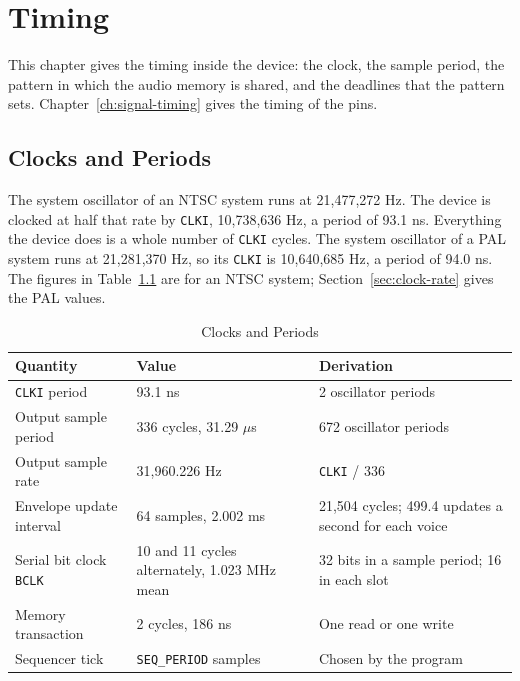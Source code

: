 \chapter{Timing}
\label{ch:timing}

This chapter gives the timing inside the device: the clock, the sample period, the pattern in which the audio memory is
shared, and the deadlines that the pattern sets. Chapter~\ref{ch:signal-timing} gives the timing of the pins.

\section{Clocks and Periods}

The system oscillator of an NTSC system runs at 21,477,272 Hz. The device is clocked at half that rate by
\texttt{CLKI}, 10,738,636 Hz, a period of 93.1 ns. Everything the device does is a whole number of \texttt{CLKI}
cycles. The system oscillator of a PAL system runs at 21,281,370 Hz, so its \texttt{CLKI} is 10,640,685 Hz, a period of
94.0 ns. The figures in Table~\ref{tab:periods} are for an NTSC system; Section~\ref{sec:clock-rate} gives the PAL
values.

\begin{table}[H]
	\centering
	\begin{tabular}{p{3.6cm}p{3.6cm}p{5.2cm}}
		\toprule
		\textbf{Quantity}              & \textbf{Value}                               & \textbf{Derivation}                                  \\
		\midrule
		\texttt{CLKI} period           & 93.1 ns                                      & 2 oscillator periods                                 \\
		Output sample period           & 336 cycles, 31.29 $\mu$s                     & 672 oscillator periods                               \\
		Output sample rate             & 31,960.226 Hz                                & \texttt{CLKI} / 336                                  \\
		Envelope update interval       & 64 samples, 2.002 ms                         & 21,504 cycles; 499.4 updates a second for each voice \\
		Serial bit clock \texttt{BCLK} & 10 and 11 cycles alternately, 1.023 MHz mean & 32 bits in a sample period; 16 in each slot          \\
		Memory transaction             & 2 cycles, 186 ns                             & One read or one write                                \\
		Sequencer tick                 & \texttt{SEQ\_PERIOD} samples                 & Chosen by the program                                \\
		\bottomrule
	\end{tabular}
	\caption{Clocks and Periods}
	\label{tab:periods}
\end{table}

